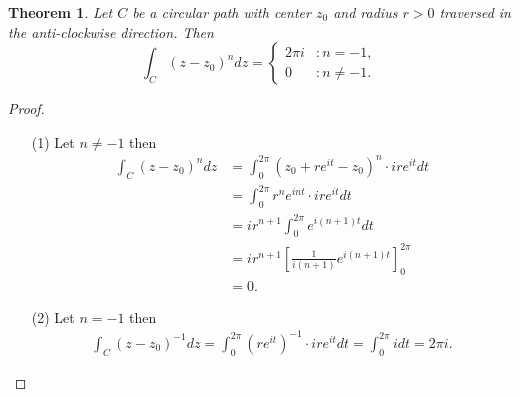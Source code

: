 \documentclass[12pt,openany]{book}
\newtheorem{theorem}{Theorem}[chapter]
\theoremstyle{definition}
\newcommand{\of}[1]{\left( #1 \right)}
\begin{document}
	\newpage
	\begin{tcolorbox}[colframe=thmcolor, title={\color{white}\bf An Important Integral}]
		\begin{theorem}
			Let $C$ be a circular path with center $z_0$ and radius $r>0$ traversed in the anti-clockwise direction. Then \[
			\int_C\of{z-z_0}^ndz=\begin{cases}
				2\pi i &:n= -1,\\
				0 &:n\neq -1.
			\end{cases}
			\]
		\end{theorem}
	\end{tcolorbox}
	\begin{proof}
		\begin{itemize}
			\item[(1)] Let $n\neq -1$ then
			\begin{align*}
				\int_C\of{z-z_0}^ndz&=\int_0^{2\pi}\of{z_0+re^{it}-z_0}^n\cdot ire^{it}dt\\
				&=\int_0^{2\pi}r^ne^{i nt}\cdot ire^{it}dt\\
				&=ir^{n+1}\int_0^{2\pi}e^{i(n+1)t}dt\\
				&=ir^{n+1}\left[\frac{1}{i(n+1)}e^{i(n+1)t}\right]_0^{2\pi}\\
				&=0.
			\end{align*}
			\item[(2)] Let $n = -1$ then
			\begin{align*}
				\int_C\of{z-z_0}^{-1}dz=\int_0^{2\pi}\of{re^{it}}^{-1}\cdot ire^{it}dt
				=\int_0^{2\pi}i dt
				=2\pi i.
			\end{align*}
		\end{itemize}
	\end{proof}
	\vspace{4pt}
\end{document}
